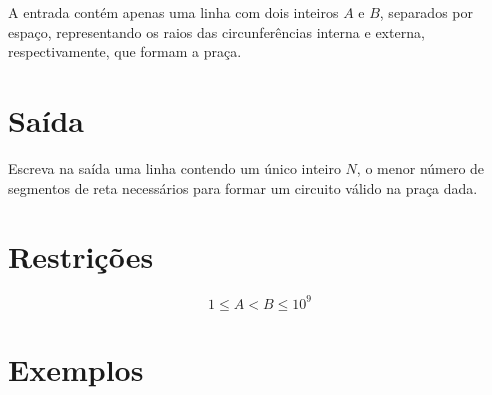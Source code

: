 A entrada contém apenas uma linha com dois inteiros $A$ e $B$, separados por espaço, representando os raios das circunferências interna e externa, respectivamente,
que formam a praça.

\section*{Saída}

Escreva na saída uma linha contendo um único inteiro $N$, o menor número de segmentos de reta necessários para formar um circuito válido na praça
dada.

\section*{Restrições}

$$1 \leq A < B \leq 10^9$$

\section*{Exemplos}
\exemplo
